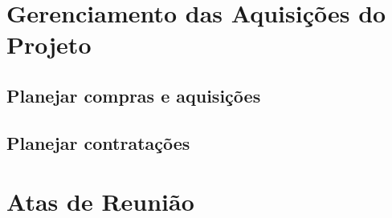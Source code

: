 \chapter{Gerenciamento das Aquisições do Projeto}



    \section{Planejar compras e aquisições}



    \section{Planejar contratações}



\chapter{Atas de Reunião}


